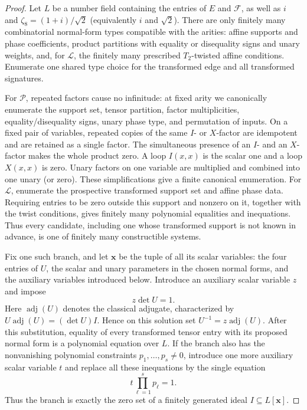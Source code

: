 \documentclass[11pt,letterpaper,onecolumn]{article}
\theoremstyle{plain}
\theoremstyle{definition}
\theoremstyle{remark}
\newcommand{\cF}{\mathcal F}
\newcommand{\cP}{\mathscr P}
\newcommand{\cL}{\mathscr L}
\begin{document}
\begin{proof}
Let \(L\) be a number field containing the entries of \(E\) and \(\cF\),
as well as \(i\) and \(\zeta_8=(1+i)/\sqrt2\) (equivalently \(i\) and
\(\sqrt2\)).  There are only finitely many combinatorial normal-form
types compatible with the arities: affine supports and phase coefficients,
product partitions with equality or disequality signs and unary weights,
and, for \(\cL\), the finitely many prescribed
\(T_2\)-twisted affine conditions.  Enumerate one shared type choice for the transformed edge and
all transformed signatures.

For \(\cP\), repeated factors cause no infinitude: at fixed arity we
canonically enumerate the support set, tensor partition, factor
multiplicities, equality/disequality signs, unary phase type, and permutation of inputs.  On a fixed pair of variables, repeated copies of the same
\(I\)- or \(X\)-factor are idempotent and are retained as a single factor.
The simultaneous presence of an \(I\)- and an \(X\)-factor makes the whole
product zero.  A loop \(I(x,x)\) is the scalar one and a loop \(X(x,x)\)
is zero.  Unary factors on one variable are multiplied and combined into
one unary (or zero). These simplifications give a finite canonical enumeration.
For \(\cL\), enumerate the prospective transformed support set and affine
phase data. Requiring entries to be zero outside this support and nonzero
on it, together with the twist conditions, gives finitely many polynomial
equalities and inequations.  Thus every candidate, including one whose
transformed support is not known in advance, is one of finitely many
constructible systems.

Fix one such branch, and let \(\mathbf x\) be the tuple of all its scalar
variables: the four entries of \(U\), the scalar and unary parameters in the
chosen normal forms, and the auxiliary variables introduced below.  Introduce
an auxiliary scalar variable \(z\) and impose
\[
 z\det U=1.
\]
Here \(\operatorname{adj}(U)\) denotes the classical adjugate, characterized
by \(U\operatorname{adj}(U)=(\det U)I\). Hence on this solution set
\(U^{-1}=z\operatorname{adj}(U)\).  After this substitution, equality of
every transformed tensor entry with its proposed normal form is a polynomial
equation over \(L\).  If the branch also has the nonvanishing polynomial
constraints \(p_1,\ldots,p_s\ne0\), introduce one more auxiliary scalar
variable \(t\) and replace all these inequations by the single equation
\[
 t\prod_{\ell=1}^s p_\ell=1.
\]
Thus the branch is exactly the zero set of a finitely generated ideal
\(I\subseteq L[\mathbf x]\).


\end{proof}
\end{document}
